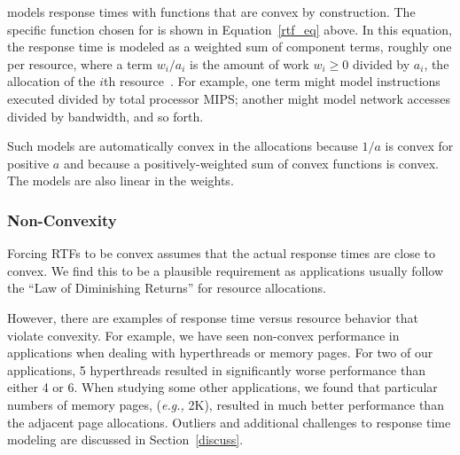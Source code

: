 \pacora models response times with functions that are convex by construction.
The specific function chosen for \pacora is shown in Equation~\ref{rtf_eq} above.
In this equation, the response time is modeled as a weighted sum of component terms,
roughly one per resource, where a term $w_i/a_i$ is the amount of work $w_i \geq 0$
divided by $a_i$, the allocation of the $i$th resource~\cite{Snav}.
For example, one term might model instructions executed divided by total processor MIPS;
another might model network accesses divided by bandwidth, and so forth.

Such models are automatically convex in the allocations because $1/a$ is convex for positive $a$ and because a positively-weighted sum of convex functions is convex.  The models are also linear in the weights.


\subsubsection*{Non-Convexity}
Forcing RTFs to be convex assumes that the actual response times are
close to convex. We find this to be a plausible requirement as
applications usually follow the ``Law of Diminishing Returns'' for
resource allocations.

However, there are examples of response time versus resource behavior that violate convexity.   For example, we have seen non-convex performance in applications when dealing with hyperthreads or memory pages.  For two of our applications, 5 hyperthreads resulted in significantly worse performance than either 4 or 6.  When studying some other applications, we found that particular numbers of memory pages, (\emph{e.g.,} 2K), resulted in much better performance than the adjacent page allocations.  Outliers and additional challenges to response time modeling are discussed in Section~\ref{discuss}.

